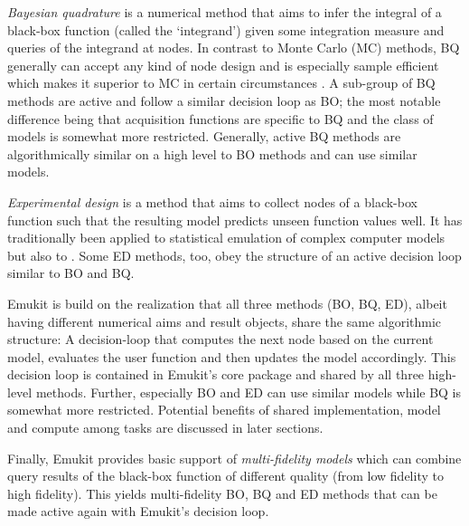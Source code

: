 \emph{Bayesian quadrature} \cite{Diaconis1988, OHagan1992, pnbook22} is a numerical method that aims to infer the integral of a black-box function (called the `integrand') given some integration measure and queries of the integrand at nodes. In contrast to Monte Carlo (MC) methods, BQ generally can accept any kind of node design and is especially sample efficient which makes it superior to MC in certain circumstances \cite{RasmussenGhahramani2002}. A sub-group of BQ methods are active and follow a similar decision loop as BO; the most notable difference being that acquisition functions are specific to BQ and the class of models is somewhat more restricted. Generally, active BQ methods are algorithmically similar on a high level to BO methods and can use similar models.

\emph{Experimental design} \cite{Kennedy2000, Kennedy2001, Conti2009, Conti2010} is a method that aims to collect nodes of a black-box function such that the resulting model predicts unseen function values well. It has traditionally been applied to statistical emulation of complex computer models  but also to . Some ED methods, too, obey the structure of an active decision loop similar to BO and BQ.

Emukit is build on the realization that all three methods (BO, BQ, ED), albeit having different numerical aims and result objects, share the same algorithmic structure: A decision-loop that computes the next node based on the current model, evaluates the user function and then updates the model accordingly. This decision loop is contained in Emukit's core package and shared by all three high-level methods.
Further, especially BO and ED can use similar models while BQ is somewhat more restricted. Potential benefits of shared implementation, model and compute among tasks are discussed in later sections.

Finally, Emukit provides basic support of \emph{multi-fidelity models} \cite{Peherstorfer2017} which can combine query results of the black-box function of different quality (from low fidelity to high fidelity). This yields multi-fidelity BO, BQ and ED methods that can be made active again with Emukit's decision loop.


